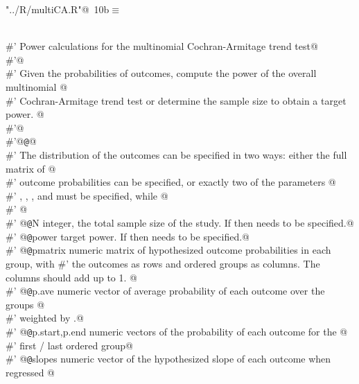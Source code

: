\documentclass[reqno]{amsart}
\renewcommand{\NWtarget}[2]{\hypertarget{#1}{#2}}
\begin{document}
\begin{flushleft} \small\label{scrap16}\raggedright\small
\NWtarget{nuweb10b}{} \verb@"../R/multiCA.R"@\nobreak\ {\footnotesize {10b}}$\equiv$
\vspace{-1ex}
\begin{list}{}{} \item
\mbox{}\verb@@\\
\mbox{}\verb@#' Power calculations for the multinomial Cochran-Armitage trend test@\\
\mbox{}\verb@#'@\\
\mbox{}\verb@#' Given the probabilities of outcomes, compute the power of the overall multinomial @\\
\mbox{}\verb@#' Cochran-Armitage trend test or determine the sample size to obtain a target power. @\\
\mbox{}\verb@#'@\\
\mbox{}\verb@#'@{\tt @}\verb@details @\\
\mbox{}\verb@#' The distribution of the outcomes can be specified in two ways: either the full matrix of @\\
\mbox{}\verb@#' outcome probabilities  can be specified, or exactly two of the parameters @\\
\mbox{}\verb@#' , , , and  must be specified, while @\\
\mbox{}\verb@#' @\\
\mbox{}\verb@#' @{\tt @}\verb@param N integer, the total sample size of the study. If  then  needs to be specified.@\\
\mbox{}\verb@#' @{\tt @}\verb@param power target power. If  then  needs to be specified.@\\
\mbox{}\verb@#' @{\tt @}\verb@param pmatrix numeric matrix of hypothesized outcome probabilities in each group,  with #' the outcomes as rows and ordered groups as columns. The columns should add up to 1. @\\
\mbox{}\verb@#' @{\tt @}\verb@param p.ave numeric vector of average probability of each outcome over the groups  @\\
\mbox{}\verb@#' weighted by .@\\
\mbox{}\verb@#' @{\tt @}\verb@param p.start,p.end numeric vectors of the probability of each outcome for the  @\\
\mbox{}\verb@#' first / last ordered group@\\
\mbox{}\verb@#' @{\tt @}\verb@param slopes numeric vector of the hypothesized slope of each outcome when regressed  @\\

\end{list}
\end{flushleft}
\end{document}
